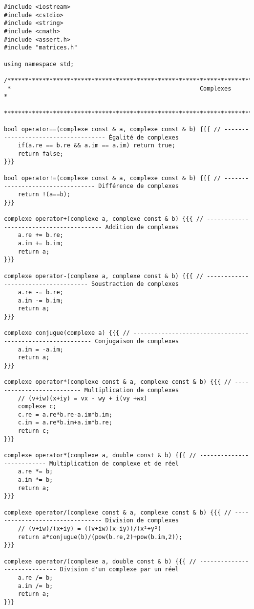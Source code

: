 \documentclass[a4paper]{article}
\begin{document}
\begin{verbatim}
#include <iostream>
#include <cstdio>
#include <string>
#include <cmath>
#include <assert.h>
#include "matrices.h"

using namespace std;

/********************************************************************************************************************** 
 *                                                      Complexes                                                     * 
 **********************************************************************************************************************/

bool operator==(complexe const & a, complexe const & b) {{{ // ------------------------------------ Égalité de complexes
    if(a.re == b.re && a.im == a.im) return true;
    return false;
}}}

bool operator!=(complexe const & a, complexe const & b) {{{ // --------------------------------- Différence de complexes
    return !(a==b);
}}}

complexe operator+(complexe a, complexe const & b) {{{ // ---------------------------------------- Addition de complexes
    a.re += b.re;
    a.im += b.im;
    return a;
}}}

complexe operator-(complexe a, complexe const & b) {{{ // ------------------------------------ Soustraction de complexes
    a.re -= b.re;
    a.im -= b.im;
    return a;
}}}

complexe conjugue(complexe a) {{{ // ---------------------------------------------------------- Conjugaison de complexes
    a.im = -a.im;
    return a;
}}}

complexe operator*(complexe const & a, complexe const & b) {{{ // -------------------------- Multiplication de complexes
    // (v+iw)(x+iy) = vx - wy + i(vy +wx)
    complexe c;
    c.re = a.re*b.re-a.im*b.im;
    c.im = a.re*b.im+a.im*b.re;
    return c;
}}}

complexe operator*(complexe a, double const & b) {{{ // -------------------------- Multiplication de complexe et de réel
    a.re *= b;
    a.im *= b;
    return a;
}}}

complexe operator/(complexe const & a, complexe const & b) {{{ // -------------------------------- Division de complexes
    // (v+iw)/(x+iy) = ((v+iw)(x-iy))/(x²+y²)
    return a*conjugue(b)/(pow(b.re,2)+pow(b.im,2));
}}}

complexe operator/(complexe a, double const & b) {{{ // ----------------------------- Division d'un complexe par un réel
    a.re /= b;
    a.im /= b;
    return a;
}}}


\end{verbatim}
\end{document}
